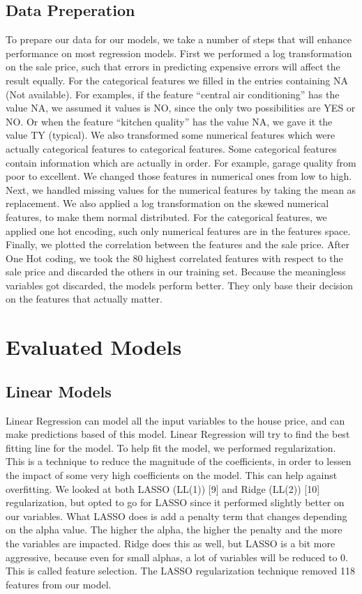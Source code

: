 \documentclass[a4paper,11pt]{article}
\begin{document}
\subsection{Data Preperation}
To prepare our data for our models, we take a number of steps that will enhance performance on most regression models. First we performed a log transformation on the sale price, such that errors in predicting expensive errors will affect the result equally. For the categorical features we filled in the entries containing NA (Not available). For examples, if the feature “central air conditioning” has the value NA, we assumed it values is NO, since the only two possibilities are YES or NO. Or when the feature “kitchen quality” has the value NA, we gave it the value TY (typical). We also transformed some numerical features which were actually categorical features to categorical features. Some categorical features contain information which are actually in order. For example, garage quality from poor to excellent. We changed those features in numerical ones from low to high.
    Next, we handled missing values for the numerical features by taking the mean as replacement. We also applied a log transformation on the skewed numerical features, to make them normal distributed. For the categorical features, we applied one hot encoding, such only numerical features are in the features space. Finally, we plotted the correlation between the features and the sale price. After One Hot coding, we took the 80 highest correlated features with respect to the sale price and discarded the others in our training set. Because the meaningless variables got discarded, the models perform better. They only base their decision on the features that actually matter.


\section{Evaluated Models}
\subsection{Linear Models}
Linear Regression can model all the input variables to the house price, and can make predictions based of this model. Linear Regression will try to find the best fitting line for the model. To help fit the model, we performed regularization. This is a technique to reduce the magnitude of the coefficients, in order to lessen the impact of some very high coefficients on the model. This can help against overfitting. We looked at both LASSO (LL(1)) [9] and Ridge (LL(2)) [10] regularization, but opted to go for LASSO since it performed slightly better on our variables. What LASSO does is add a penalty term that changes depending on the alpha value. The higher the alpha, the higher the penalty and the more the variables are impacted. Ridge does this as well, but LASSO is a bit more aggressive, because even for small alphas, a lot of variables will be reduced to 0. This is called feature selection.  The LASSO regularization technique removed 118 features from our model. 
\end{document}

